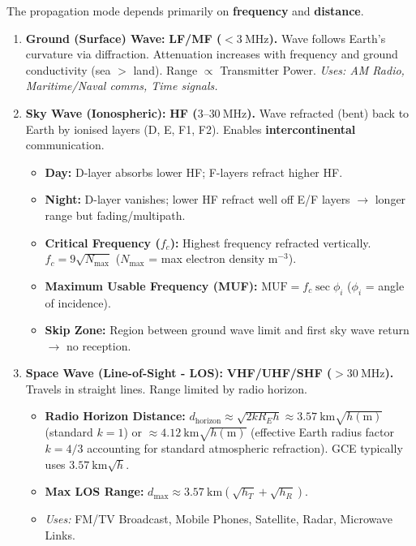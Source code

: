 \documentclass[11pt]{article}
\begin{document}
\begin{propriete}
The propagation mode depends primarily on \textbf{frequency} and \textbf{distance}.
\begin{enumerate}
\item \textbf{Ground (Surface) Wave:} \textbf{LF/MF ($< 3\ \mathrm{MHz}$).} Wave follows Earth's curvature via diffraction. Attenuation increases with frequency and ground conductivity (sea $>$ land). Range $\propto$ Transmitter Power. \emph{Uses: AM Radio, Maritime/Naval comms, Time signals.}
\item \textbf{Sky Wave (Ionospheric):} \textbf{HF ($3\text{--}30\ \mathrm{MHz}$).} Wave refracted (bent) back to Earth by ionised layers (D, E, F1, F2). Enables \textbf{intercontinental} communication.
\begin{itemize}
\item \textbf{Day:} D-layer absorbs lower HF; F-layers refract higher HF.
\item \textbf{Night:} D-layer vanishes; lower HF refract well off E/F layers $\to$ longer range but fading/multipath.
\item \textbf{Critical Frequency ($f_c$):} Highest frequency refracted vertically. $f_c = 9\sqrt{N_{\max}}$ ($N_{\max}$ = max electron density $\mathrm{m}^{-3}$).
\item \textbf{Maximum Usable Frequency (MUF):} $\mathrm{MUF} = f_c \sec \phi_i$ ($\phi_i$ = angle of incidence).
\item \textbf{Skip Zone:} Region between ground wave limit and first sky wave return $\to$ no reception.
\end{itemize}
\item \textbf{Space Wave (Line-of-Sight - LOS):} \textbf{VHF/UHF/SHF ($> 30\ \mathrm{MHz}$).} Travels in straight lines. Range limited by radio horizon.
\begin{itemize}
\item \textbf{Radio Horizon Distance:} $d_{\mathrm{horizon}} \approx \sqrt{2 k R_E h} \approx 3.57\ \mathrm{km} \sqrt{h(\mathrm{m})}$ (standard $k=1$) or $\approx 4.12\ \mathrm{km} \sqrt{h(\mathrm{m})}$ (effective Earth radius factor $k=4/3$ accounting for standard atmospheric refraction). GCE typically uses \textbf{$3.57\ \mathrm{km} \sqrt{h}$}.
\item \textbf{Max LOS Range:} $d_{\max} \approx 3.57\ \mathrm{km} \left( \sqrt{h_T} + \sqrt{h_R} \right)$.
\item \emph{Uses:} FM/TV Broadcast, Mobile Phones, Satellite, Radar, Microwave Links.
\end{itemize}
\end{enumerate}
\end{propriete}
\end{document}
